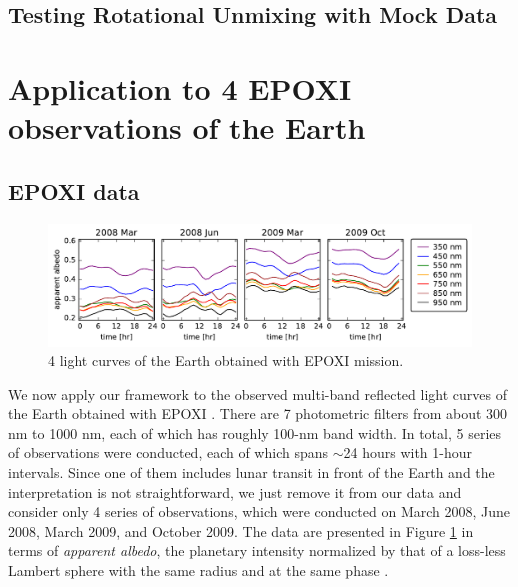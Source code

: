 \documentclass[iop,numberedappendix,apj,]{emulateapj}
\begin{document}
\subsection{Testing Rotational Unmixing with Mock Data}
\label{ss:testmockdata}


\newpage

\section{Application to 4 EPOXI observations of the Earth}
\label{s:epoxi}

\subsection{EPOXI data}
\label{ss:epoxidata}

\begin{figure}[!tb]
    \begin{center}
\includegraphics[width=\hsize]{EPOXI_vislightcurve_4obs.pdf}
    \end{center}
    \caption{4 light curves of the Earth obtained with EPOXI mission.}
\label{fig:EPOXIlc}
\end{figure}

We now apply our framework to the observed multi-band reflected light curves of the Earth obtained with EPOXI \citep{Livengood2011, Cowan2011}. 
There are 7 photometric filters from about 300 nm to 1000 nm, each of which has roughly 100-nm band width. 
In total, 5 series of observations were conducted, each of which spans $\sim $24 hours with 1-hour intervals. 
Since one of them includes lunar transit in front of the Earth and the interpretation is not straightforward, we just remove it from our data and consider only 4 series of observations, which were conducted on March 2008, June 2008, March 2009, and October 2009. 
The data are presented in Figure \ref{fig:EPOXIlc} in terms of {\it apparent albedo}, the planetary intensity normalized by that of a loss-less Lambert sphere with the same radius and at the same phase \citep{Qiu2003, Seager2010}. 
\end{document}
